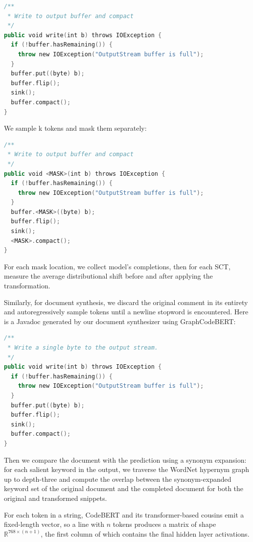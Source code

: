 \documentclass[sigconf,review,anonymous]{acmart}
\begin{document}
  \begin{lstlisting}[basicstyle=\scriptsize\ttfamily, language=kotlin,label={lst:example1}]
/**
 * Write to output buffer and compact
 */
public void write(int b) throws IOException {
  if (!buffer.hasRemaining()) {
    throw new IOException("OutputStream buffer is full");
  }
  buffer.put((byte) b);
  buffer.flip();
  sink();
  buffer.compact();
}
  \end{lstlisting}

  We sample k tokens and mask them separately:

  \begin{lstlisting}[basicstyle=\scriptsize\ttfamily, language=kotlin,label={lst:example2}]
/**
 * Write to output buffer and compact
 */
public void <MASK>(int b) throws IOException {
  if (!buffer.hasRemaining()) {
    throw new IOException("OutputStream buffer is full");
  }
  buffer.<MASK>((byte) b);
  buffer.flip();
  sink();
  <MASK>.compact();
}
  \end{lstlisting}

  For each mask location, we collect model's completions, then for each SCT, measure the average distributional shift before and after applying the transformation.

  Similarly, for document synthesis, we discard the original comment in its entirety and autoregressively sample tokens until a newline stopword is encountered. Here is a Javadoc generated by our document synthesizer using GraphCodeBERT:

  \begin{lstlisting}[basicstyle=\scriptsize\ttfamily, language=kotlin,label={lst:example3}]
/**
 * Write a single byte to the output stream.
 */
public void write(int b) throws IOException {
  if (!buffer.hasRemaining()) {
    throw new IOException("OutputStream buffer is full");
  }
  buffer.put((byte) b);
  buffer.flip();
  sink();
  buffer.compact();
}
  \end{lstlisting}

  Then we compare the document with the prediction using a synonym expansion: for each salient keyword in the output, we traverse the WordNet hypernym graph up to depth-three and compute the overlap between the synonym-expanded keyword set of the original document and the completed document for both the original and transformed snippets.

For each token in a string, CodeBERT and its transformer-based cousins emit a fixed-length vector, so a line with $n$ tokens produces a matrix of shape $\mathbb R^{768 \times (n + 1)}$, the first column of which contains the final hidden layer activations. %
%
\end{document}
